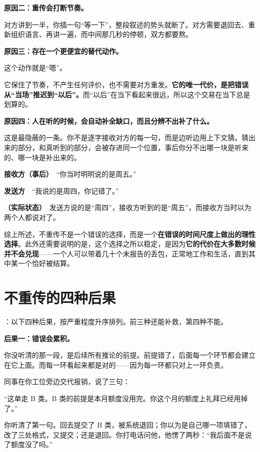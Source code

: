 \textbf{原因二：重传会打断节奏。}

对方讲到一半，你插一句“等一下”，整段叙述的势头就断了。对方需要退回去、重新组织语言、再讲一遍，而中间那几秒的停顿，双方都要熬。

\textbf{原因三：存在一个更便宜的替代动作。}

这个动作就是“嗯”。

它保住了节奏，不产生任何评价，也不需要对方重发。\textbf{它的唯一代价，是把错误从“当场”推迟到“以后”。}而“以后”在当下看起来很远，所以这个交易在当下总是划算的。

\textbf{原因四：人在听的时候，会自动补全缺口，而且分辨不出补了什么。}

这是最隐蔽的一条。你不是逐字接收对方的每一句，而是边听边用上下文猜。猜出来的部分，和真听到的部分，会被存进同一个位置，事后你分不出哪一块是听来的、哪一块是补出来的。

\begin{mdquote}
\textbf{接收方（事后）}　“你当时明明说的是周五。”

\textbf{发送方}　“我说的是周四，你记错了。”

\textbf{（实际状态）}　发送方说的是“周四”，接收方听到的是“周五”，而接收方当时以为两个人都说对了。
\end{mdquote}

综上所述，不重传不是一个错误的选择，而是一个\textbf{在错误的时间尺度上做出的理性选择}。此外还需要说明的是，这个选择之所以稳定，是因为\textbf{它的代价在大多数时候并不会兑现}——一个人可以带着几十个未报告的丢包，正常地工作和生活，直到其中某一个恰好被结算。

\section{不重传的四种后果}

：以下四种后果，按严重程度升序排列。前三种还能补救，第四种不能。

\textbf{后果一：错误会累积。}

你没听清的那一段，是后续所有推论的前提。前提错了，后面每一个环节都会建立在它上面。而每一环看起来都是对的——因为每一环都只对上一环负责。

\par
\begin{mdquote}
同事在你工位旁边交代报销，说了三句：

“这单走 B 类。B 类的前提是本月额度没用完。你这个月的额度上礼拜已经用掉了。”

你听清了第一句。回去提交了 B 类，被系统退回；你以为是自己哪一项填错了，改了三处格式，又提交；还是退回。你打电话问他，他愣了两秒：“我后面不是说了额度没了吗。”
\end{mdquote}

